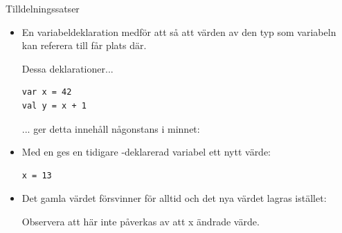 \begin{Slide}{Tilldelningssatser}\SlideFontTiny

\begin{itemize}
\item En variabeldeklaration medför att  så att värden av den typ som variabeln kan referera till får plats där.  %


\begin{multicols}{2}

Dessa deklarationer...
\begin{lstlisting}
var x = 42
val y = x + 1
\end{lstlisting}
... ger detta innehåll någonstans i minnet:



\end{multicols}


\item Med en  ges en tidigare -deklarerad variabel ett nytt värde:
\begin{lstlisting}
x = 13
\end{lstlisting}

\item Det gamla värdet försvinner för alltid och det nya värdet lagras istället: \\

Observera att  här inte påverkas av att x ändrade värde.
\end{itemize}
\end{Slide}

